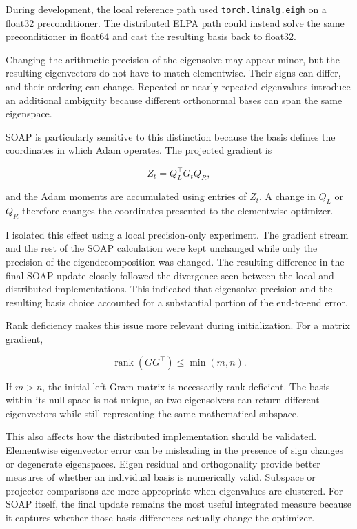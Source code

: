 \documentclass[11pt]{article}
\begin{document}
During development, the local reference path used \texttt{torch.linalg.eigh} on a float32 preconditioner. The distributed ELPA path could instead solve the same preconditioner in float64 and cast the resulting basis back to float32.

Changing the arithmetic precision of the eigensolve may appear minor, but the resulting eigenvectors do not have to match elementwise. Their signs can differ, and their ordering can change. Repeated or nearly repeated eigenvalues introduce an additional ambiguity because different orthonormal bases can span the same eigenspace.

SOAP is particularly sensitive to this distinction because the basis defines the coordinates in which Adam operates. The projected gradient is

\begin{equation}
Z_t = Q_L^\top G_t Q_R,
\end{equation}

and the Adam moments are accumulated using entries of $Z_t$. A change in $Q_L$ or $Q_R$ therefore changes the coordinates presented to the elementwise optimizer.

I isolated this effect using a local precision-only experiment. The gradient stream and the rest of the SOAP calculation were kept unchanged while only the precision of the eigendecomposition was changed. The resulting difference in the final SOAP update closely followed the divergence seen between the local and distributed implementations. This indicated that eigensolve precision and the resulting basis choice accounted for a substantial portion of the end-to-end error.

Rank deficiency makes this issue more relevant during initialization. For a matrix gradient,

\begin{equation}
\operatorname{rank}(GG^\top) \leq \min(m,n).
\end{equation}

If $m>n$, the initial left Gram matrix is necessarily rank deficient. The basis within its null space is not unique, so two eigensolvers can return different eigenvectors while still representing the same mathematical subspace.

This also affects how the distributed implementation should be validated. Elementwise eigenvector error can be misleading in the presence of sign changes or degenerate eigenspaces. Eigen residual and orthogonality provide better measures of whether an individual basis is numerically valid. Subspace or projector comparisons are more appropriate when eigenvalues are clustered. For SOAP itself, the final update remains the most useful integrated measure because it captures whether those basis differences actually change the optimizer.
\end{document}
